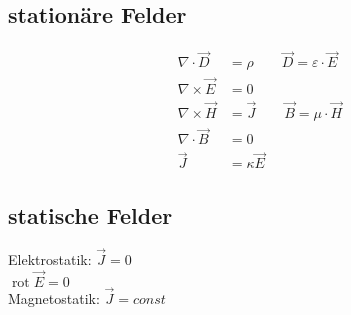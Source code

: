 \subsection{stationäre Felder}
\begin{align*}
    \nabla \cdot \vec{D} &= \rho \qquad \vec{D} = \varepsilon \cdot \vec{E}\\
    \nabla \times \vec{E} &= 0\\
    \nabla \times \vec{H} &= \vec{J} \qquad \vec{B} = \mu \cdot \vec{H}\\
    \nabla \cdot \vec{B} &= 0\\
    \vec{J} &= \kappa \vec{E}
\end{align*}

\subsection{statische Felder}
Elektrostatik: $\vec{J} = 0$\\
$\operatorname{rot} \vec{E} = 0$\\
Magnetostatik: $\vec{J} = const$